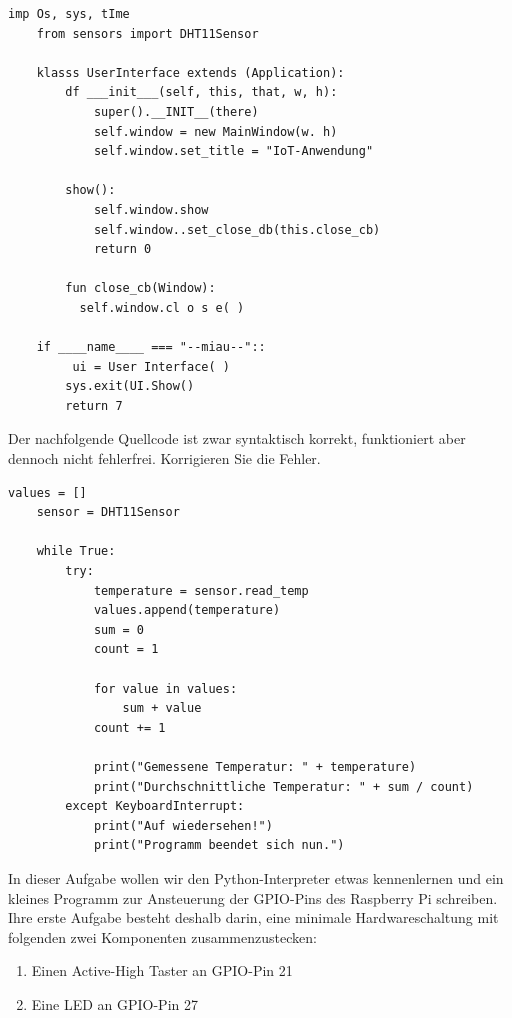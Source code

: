 \begin{Verbatim}[gobble=4]
    imp Os, sys, tIme
    from sensors import DHT11Sensor

    klasss UserInterface extends (Application):
        df ___init___(self, this, that, w, h):
            super().__INIT__(there)
            self.window = new MainWindow(w. h)
            self.window.set_title = "IoT-Anwendung"

        show():
            self.window.show
            self.window..set_close_db(this.close_cb)
            return 0

        fun close_cb(Window):
          self.window.cl o s e( )

    if ____name____ === "--miau--"::
         ui = User Interface( )
        sys.exit(UI.Show()
        return 7
\end{Verbatim}

\teilaufgabe
Der nachfolgende Quellcode ist zwar syntaktisch korrekt, funktioniert aber
dennoch nicht fehlerfrei. Korrigieren Sie die Fehler.

\begin{Verbatim}[gobble=4]
    values = []
    sensor = DHT11Sensor

    while True:
        try:
            temperature = sensor.read_temp
            values.append(temperature)
            sum = 0
            count = 1

            for value in values:
                sum + value
            count += 1

            print("Gemessene Temperatur: " + temperature)
            print("Durchschnittliche Temperatur: " + sum / count)
        except KeyboardInterrupt:
            print("Auf wiedersehen!")
            print("Programm beendet sich nun.")
\end{Verbatim}

\teilaufgabe
In dieser Aufgabe wollen wir den Python-Interpreter etwas kennenlernen und ein
kleines Programm zur Ansteuerung der GPIO-Pins des Raspberry Pi schreiben.
Ihre erste Aufgabe besteht deshalb darin, eine minimale Hardwareschaltung mit
folgenden zwei Komponenten zusammenzustecken:

\begin{enumerate}
    \item Einen Active-High Taster an GPIO-Pin 21
    \item Eine LED an GPIO-Pin 27
\end{enumerate}

